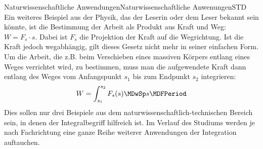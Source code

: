 \begin{MXContent}{Naturwissenschaftliche Anwendungen}{Naturwissenschaftliche Anwenungen}{STD}
Ein weiteres Beispiel aus der Physik, das der Leserin oder dem Leser bekannt 
sein könnte, ist die Bestimmung der Arbeit als Produkt aus Kraft und Weg:
$W = F_s \cdot s$. Dabei ist $F_s$ die Projektion der Kraft auf die Wegrichtung.
Ist die Kraft jedoch wegabhängig, gilt dieses Gesetz nicht mehr in seiner 
einfachen Form. Um die Arbeit, die z.B. beim Verschieben eines massiven 
Körpers entlang eines Weges verrichtet wird, zu bestimmen, muss man die 
aufgewendete Kraft dann entlang des Weges vom Anfangspunkt $s_1$ bis zum 
Endpunkt $s_2$ integrieren:
%
\begin{eqnarray*}
W = \int_{s_1}^{s_2}F_s(s) \MDwSp s \MDFPeriod
\end{eqnarray*}
%
Dies sollen nur drei Beispiele aus dem naturwissenschaftlich-technischen 
Bereich sein, in denen der Integralbegriff hilfreich ist. 
Im Verlauf des Studiums werden je nach Fachrichtung eine ganze Reihe weiterer 
Anwendungen der Integration auftauchen.
\end{MXContent}



